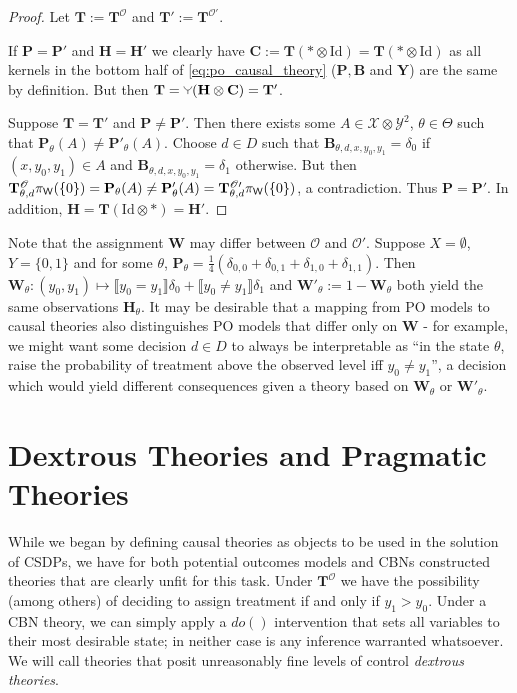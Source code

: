 \begin{proof}

Let $\mathbf{T}:=\mathbf{T}^{\mathscr{O}}$ and $\mathbf{T}':=\mathbf{T}^{\mathscr{O}'}$.

If $\mathbf{P}=\mathbf{P}'$ and $\mathbf{H}=\mathbf{H}'$ we clearly have $\mathbf{C}:=\mathbf{T}(*\otimes \mathrm{Id}) = \mathbf{T}(*\otimes \mathrm{Id})$ as all kernels in the bottom half of \ref{eq:po_causal_theory} ($\mathbf{P},\mathbf{B}$ and $\mathbf{Y}$) are the same by definition. But then $\mathbf{T} = \splitter{0.1}(\mathbf{H}\otimes\mathbf{C}) = \mathbf{T}'$.

Suppose $\mathbf{T}=\mathbf{T}'$ and $\mathbf{P}\neq \mathbf{P}'$. Then there exists some $A\in \mathcal{X}\otimes\mathcal{Y}^2$, $\theta\in \Theta$ such that $\mathbf{P}_\theta (A) \neq \mathbf{P}'_\theta(A)$. Choose $d\in D$ such that $\mathbf{B}_{\theta,d,x,y_0,y_1} = \delta_0$ if $(x,y_0,y_1)\in A$ and $\mathbf{B}_{\theta,d,x,y_0,y_1} = \delta_1$ otherwise. But then $\mathbf{T}^\mathscr{O}_{\theta,d} \pi_{\mathsf{W}} (\{0\})  =\mathbf{P}_\theta (A) \neq \mathbf{P}'_\theta(A) = \mathbf{T}^{\mathscr{O}\prime}_{\theta,d} \pi_{\mathsf{W}} (\{0\})$, a contradiction. Thus $\mathbf{P}=\mathbf{P}'$. In addition, $\mathbf{H} = \mathbf{T}(\mathrm{Id}\otimes *) = \mathbf{H}'$.
\end{proof}

Note that the assignment $\mathbf{W}$ may differ between $\mathscr{O}$ and $\mathscr{O}'$. Suppose $X=\emptyset$, $Y=\{0,1\}$ and for some $\theta$, $\mathbf{P}_\theta = \frac{1}{4}(\delta_{0,0}+\delta_{0,1}+\delta_{1,0}+\delta_{1,1})$. Then $\mathbf{W}_\theta:(y_0,y_1)\mapsto \llbracket y_0=y_1\rrbracket\delta_0 + \llbracket y_0\neq y_1\rrbracket \delta_1$ and $\mathbf{W}'_\theta := 1-\mathbf{W}_\theta$ both yield the same observations $\mathbf{H}_\theta$. It may be desirable that a mapping from PO models to causal theories also distinguishes PO models that differ only on $\mathbf{W}$ - for example, we might want some decision $d\in D$ to always be interpretable as ``in the state $\theta$, raise the probability of treatment above the observed level iff $y_0\neq y_1$'', a decision which would yield different consequences given a theory based on $\mathbf{W}_\theta$ or $\mathbf{W}'_\theta$. 

\section{Dextrous Theories and Pragmatic Theories}

While we began by defining causal theories as objects to be used in the solution of CSDPs, we have for both potential outcomes models and CBNs constructed theories that are clearly unfit for this task. Under $\mathbf{T}^{\mathscr{O}}$ we have the possibility (among others) of deciding to assign treatment if and only if $y_1 > y_0$. Under a CBN theory, we can simply apply a $do()$ intervention that sets all variables to their most desirable state; in neither case is any inference warranted whatsoever. We will call theories that posit unreasonably fine levels of control \emph{dextrous theories}.

